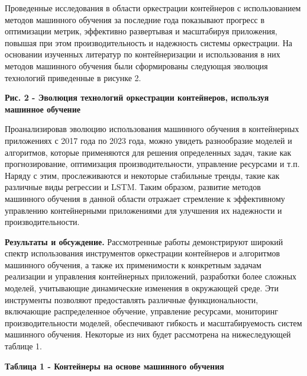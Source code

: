 Проведенные исследования в области оркестрации контейнеров с
использованием методов машинного обучения за последние года показывают
прогресс в оптимизации метрик, эффективно развертывая и масштабируя
приложения, повышая при этом производительность и надежность системы
оркестрации. На основании изученных литератур по контейнеризации и
использования в них методов машинного обучения были сформированы
следующая эволюция технологий приведенные в рисунке 2.

\textbf{Рис. 2 - Эволюция технологий оркестрации контейнеров, используя
машинное обучение}

Проанализировав эволюцию использования машинного обучения в контейнерных
приложениях с 2017 года по 2023 года, можно увидеть разнообразие моделей
и алгоритмов, которые применяются для решения определенных задач, такие
как прогнозирование, оптимизация производительности, управление
ресурсами и т.п. Наряду с этим, прослеживаются и некоторые стабильные
тренды, такие как различные виды регрессии и LSTM. Таким образом,
развитие методов машинного обучения в данной области отражает стремление
к эффективному управлению контейнерными приложениями для улучшения их
надежности и производительности.

\textbf{Результаты и обсуждение.} Рассмотренные работы демонстрируют
широкий спектр использования инструментов оркестрации контейнеров и
алгоритмов машинного обучения, а также их применимости к конкретным
задачам реализации и управления контейнерных приложений, разработки
более сложных моделей, учитывающие динамические изменения в окружающей
среде. Эти инструменты позволяют предоставлять различные
функциональности, включающие распределенное обучение, управление
ресурсами, мониторинг производительности моделей, обеспечивают гибкость
и масштабируемость систем машинного обучения. Некоторые из них будет
рассмотрена на нижеследующей таблице 1.

\textbf{Таблица 1 - Контейнеры на основе машинного обучения}

